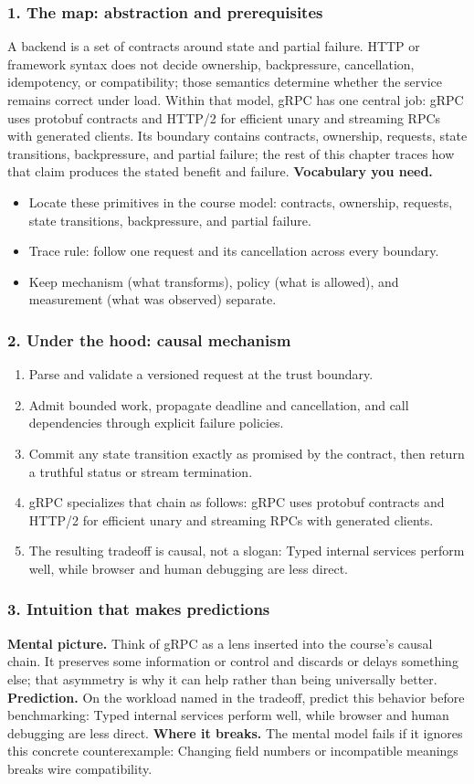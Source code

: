 \subsubsection*{1. The map: abstraction and prerequisites}
A backend is a set of contracts around state and partial failure. HTTP or framework syntax does not decide ownership, backpressure, cancellation, idempotency, or compatibility; those semantics determine whether the service remains correct under load.
Within that model, gRPC has one central job: gRPC uses protobuf contracts and HTTP/2 for efficient unary and streaming RPCs with generated clients. Its boundary contains contracts, ownership, requests, state transitions, backpressure, and partial failure; the rest of this chapter traces how that claim produces the stated benefit and failure.
\textbf{Vocabulary you need.}\begin{itemize}
\item Locate these primitives in the course model: contracts, ownership, requests, state transitions, backpressure, and partial failure.
\item Trace rule: follow one request and its cancellation across every boundary.
\item Keep mechanism (what transforms), policy (what is allowed), and measurement (what was observed) separate.
\end{itemize}
\subsubsection*{2. Under the hood: causal mechanism}\begin{enumerate}
\item Parse and validate a versioned request at the trust boundary.
\item Admit bounded work, propagate deadline and cancellation, and call dependencies through explicit failure policies.
\item Commit any state transition exactly as promised by the contract, then return a truthful status or stream termination.
\item gRPC specializes that chain as follows: gRPC uses protobuf contracts and HTTP/2 for efficient unary and streaming RPCs with generated clients.
\item The resulting tradeoff is causal, not a slogan: Typed internal services perform well, while browser and human debugging are less direct.
\end{enumerate}
\subsubsection*{3. Intuition that makes predictions}
\textbf{Mental picture.} Think of gRPC as a lens inserted into the course's causal chain. It preserves some information or control and discards or delays something else; that asymmetry is why it can help rather than being universally better.
\textbf{Prediction.} On the workload named in the tradeoff, predict this behavior before benchmarking: Typed internal services perform well, while browser and human debugging are less direct.
\textbf{Where it breaks.} The mental model fails if it ignores this concrete counterexample: Changing field numbers or incompatible meanings breaks wire compatibility.
